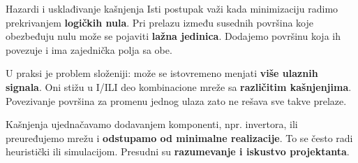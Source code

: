 \begin{frame}[label=02-s054]{Hazardi i usklađivanje kašnjenja}
\setlength{\parskip}{0pt}
Isti postupak važi kada minimizaciju radimo prekrivanjem \textbf{logičkih nula}. Pri prelazu između susednih površina koje obezbeđuju nulu može se pojaviti \alert{\textbf{lažna jedinica}}. Dodajemo površinu koja ih povezuje i ima zajednička polja sa obe.\par
\par\vspace{3mm}
U praksi je problem složeniji: može se istovremeno menjati \textbf{više ulaznih signala}. Oni stižu u I/ILI deo kombinacione mreže sa \textbf{različitim kašnjenjima}. Povezivanje površina za promenu jednog ulaza zato ne rešava sve takve prelaze.\par
\par\vspace{3mm}
Kašnjenja ujednačavamo dodavanjem komponenti, npr. invertora, ili preuređujemo mrežu i \alert{\textbf{odstupamo od minimalne realizacije}}. To se često radi heuristički ili simulacijom. Presudni su \textbf{razumevanje i iskustvo projektanta}.
\end{frame}
